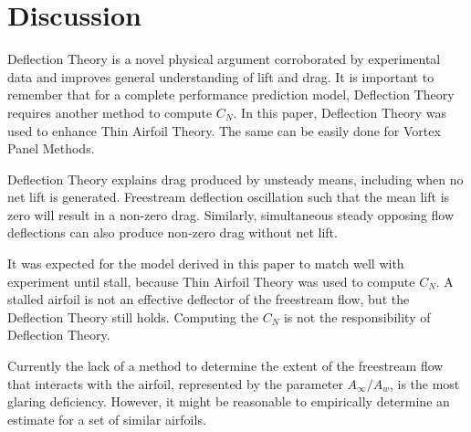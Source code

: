 \section{Discussion}

Deflection Theory is a novel physical argument corroborated by experimental data and improves general understanding of lift and drag.
It is important to remember that for a complete performance prediction model, Deflection Theory requires another method to compute \(C_N\).
In this paper, Deflection Theory was used to enhance Thin Airfoil Theory.
The same can be easily done for Vortex Panel Methods.

Deflection Theory explains drag produced by unsteady means, including when no net lift is generated.
Freestream deflection oscillation such that the mean lift is zero will result in a non-zero drag.
Similarly, simultaneous steady opposing flow deflections can also produce non-zero drag without net lift.

It was expected for the model derived in this paper to match well with experiment until stall, because Thin Airfoil Theory was used to compute \(C_N\).
A stalled airfoil is not an effective deflector of the freestream flow, but the Deflection Theory still holds.
Computing the \(C_N\) is not the responsibility of Deflection Theory.

Currently the lack of a method to determine the extent of the freestream flow that interacts with the airfoil, represented by the parameter \(A_\infty / A_w\), is the most glaring deficiency.
However, it might be reasonable to empirically determine an estimate for a set of similar airfoils.


